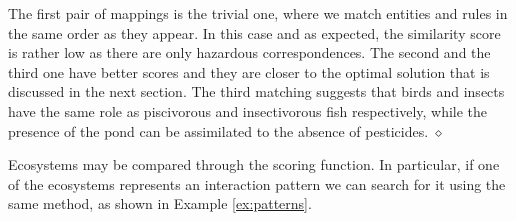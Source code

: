 \documentclass[a4paper,twoside]{article}
\begin{document}
\begin{example}[Similarity]
\begin{enumerate}
\end{enumerate}
%
The first pair of mappings is the trivial one, where we match entities and rules in the same order as they appear. In this case and as expected, the similarity score is rather low as there are only hazardous correspondences. 
%
The second and the third one have better scores and they are closer to the optimal solution that is discussed in the next section.  
%
The third matching  suggests that birds and insects have the same role as piscivorous and insectivorous fish respectively, while the presence of the pond can be assimilated to the absence of pesticides.  
\hfill $\diamond$
\end{example}

Ecosystems may be compared through the scoring function. In particular, if one of the ecosystems represents an interaction pattern we can search for it using the same method, as shown in Example \ref{ex:patterns}. 
\end{document}
